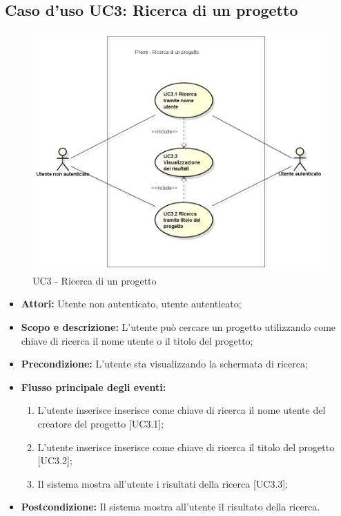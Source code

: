 \subsection{Caso d'uso UC3: Ricerca di un progetto}
\begin{figure}[h] 
	\centering 
	\includegraphics[scale=0.45] {img/UC3.png} 
	\caption{UC3 - Ricerca di un progetto} 
\end{figure}

\begin{itemize}
	\item \textbf{Attori:} Utente non autenticato, utente autenticato;
	\item \textbf{Scopo e descrizione:} L'utente può cercare un progetto utilizzando come chiave di ricerca il nome utente o il titolo del progetto;
	\item \textbf{Precondizione:} L'utente sta visualizzando la schermata di ricerca;
	\item \textbf{Flusso principale degli eventi:}
	\begin{enumerate}
		\item L'utente inserisce inserisce come chiave di ricerca il nome utente del creatore del progetto [UC3.1];
		\item L'utente inserisce inserisce come chiave di ricerca il titolo del progetto [UC3.2];
		\item Il sistema mostra all'utente i risultati della ricerca [UC3.3];
	\end{enumerate}
	\item \textbf{Postcondizione:} Il sistema mostra all'utente il risultato della ricerca.
\end{itemize}

